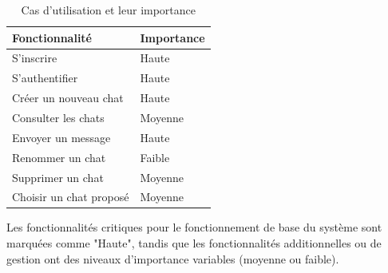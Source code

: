 \begin{table}[h]
\centering
\begin{tabular}{|p{12cm}|l|}
\hline
\textbf{Fonctionnalité} & \textbf{Importance} \\ \hline
S'inscrire              & Haute               \\ \hline
S'authentifier          & Haute               \\ \hline
Créer un nouveau chat   & Haute               \\ \hline
Consulter les chats     & Moyenne             \\ \hline
Envoyer un message      & Haute               \\ \hline
Renommer un chat        & Faible              \\ \hline
Supprimer un chat       & Moyenne             \\ \hline
Choisir un chat proposé & Moyenne             \\ \hline
\end{tabular}
\caption{Cas d'utilisation et leur importance}
\label{tab:use_cases}
\end{table}

Les fonctionnalités critiques pour le fonctionnement de base du système sont marquées comme "Haute", tandis que les fonctionnalités additionnelles ou de gestion ont des niveaux d'importance variables (moyenne ou faible).


